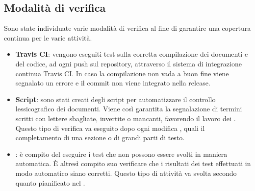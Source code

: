 \subsection{Modalità di verifica}
Sono state individuate varie modalità di verifica al fine di garantire una copertura continua per le varie attività.
\begin{itemize}
	\item \textbf{Travis CI}: vengono eseguiti test sulla corretta compilazione dei documenti e del codice, ad ogni push sul repository, attraverso il sistema di integrazione continua Travis CI. In caso la compilazione non vada a buon fine viene segnalato un errore e il commit non viene integrato nella release.
	\item \textbf{Script}: sono stati creati degli script per automatizzare il controllo lessicografico dei documenti. Viene così garantita la segnalazione di termini scritti con lettere sbagliate, invertite o mancanti, favorendo il lavoro dei \Verificatori{}. Questo tipo di verifica va eseguito dopo ogni modifica , quali il completamento di una sezione o di grandi parti di testo.
	\item \textbf{\Verificatore{}}: è compito del \Verificatore{} eseguire i test che non possono essere svolti in maniera automatica. È altresì compito suo verificare che i risultati dei test effettuati in modo automatico siano corretti. Questo tipo di attività va svolta secondo quanto pianificato nel \PianoDiProgetto{}.
\end{itemize}
